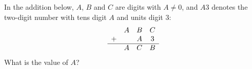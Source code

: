 In the addition below, $A$, $B$ and $C$ are digits with $A\ne0$, and $A3$ denotes the two-digit number with tens digit $A$ and units digit $3$:
\[\begin{array}{cccc}
 & A & B & C\\
+ & & A & 3\\ \hline
 & A & C & B
\end{array}\]
What is the value of $A$?
